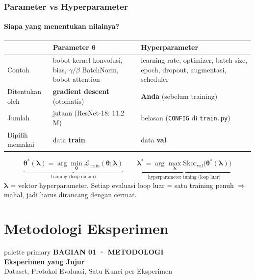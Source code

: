 \documentclass[t,aspectratio=169,xcolor={dvipsnames,table}]{beamer}
\newcommand{\bagian}[3]{%
\begin{frame}[plain]
  \begin{beamercolorbox}[wd=\paperwidth,ht=\paperheight,sep=1.5cm]{palette primary}
    \vspace{1.5cm}
    {\scriptsize\bfseries\color{dlMute}#1}\\[0.4cm]
    {\Huge\bfseries #2}\\[0.4cm]
    {\small\color{dlHairline}#3}
    \vfill
  \end{beamercolorbox}
\end{frame}}
\begin{document}
\begin{frame}
    \frametitle{Parameter vs Hyperparameter}
    \framesubtitle{Siapa yang menentukan nilainya?}
    \footnotesize

    \vspace{4pt}
    \begin{center}
    \renewcommand{\arraystretch}{1.25}
    \begin{tabular}{p{2.6cm}p{5.0cm}p{5.0cm}}
        \toprule
        & \textbf{Parameter} $\bm{\theta}$ & \textbf{Hyperparameter} \\
        \midrule
        Contoh & bobot kernel konvolusi, bias, $\gamma/\beta$ BatchNorm, bobot attention & learning rate, optimizer, batch size, epoch, dropout, augmentasi, scheduler \\
        Ditentukan oleh & \textbf{gradient descent} (otomatis) & \textbf{Anda} (sebelum training) \\
        Jumlah & jutaan (ResNet-18: 11,2 M) & belasan (\texttt{CONFIG} di \texttt{train.py}) \\
        Dipilih memakai & data \textbf{train} & data \textbf{val} \\
        \bottomrule
    \end{tabular}
    \end{center}

    \vspace{0.2cm}
    \[
        \underbrace{\bm{\theta}^{*}(\bm{\lambda}) = \arg\min_{\bm{\theta}} \mathcal{L}_{\text{train}}(\bm{\theta};\bm{\lambda})}_{\text{training (loop dalam)}}
        \qquad
        \underbrace{\bm{\lambda}^{*} = \arg\max_{\bm{\lambda}} \text{Skor}_{\text{val}}\big(\bm{\theta}^{*}(\bm{\lambda})\big)}_{\text{hyperparameter tuning (loop luar)}}
    \]
    {\scriptsize\color{dlMute} $\bm{\lambda}$ = vektor hyperparameter. Setiap evaluasi loop luar = satu training penuh $\Rightarrow$ mahal, jadi harus dirancang dengan cermat.}
\end{frame}

\section{Metodologi Eksperimen}
\bagian{BAGIAN 01 · METODOLOGI}{Eksperimen yang Jujur}{Dataset, Protokol Evaluasi, Satu Kunci per Eksperimen}
\end{document}
